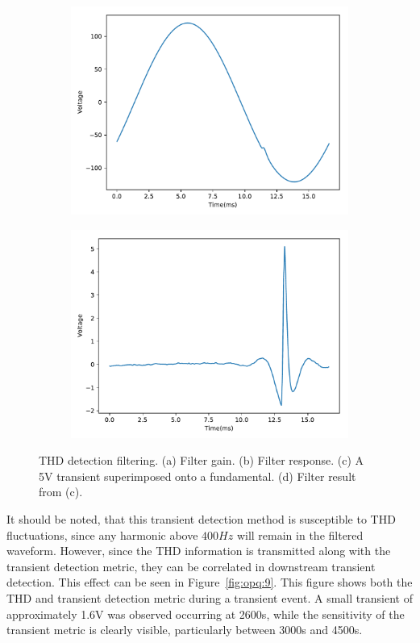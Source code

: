 \begin{figure}[h]
	\begin{subfigure}{.5\textwidth}
		\centering
		\includegraphics[width=0.86\linewidth]{img/box_eval/5v_transient.pdf}
		\caption{}
		\label{fig:opq:8:3}
	\end{subfigure}%
	\begin{subfigure}{.5\textwidth}
		\centering
		\includegraphics[width=0.86\linewidth]{img/box_eval/5v_transient_filtered.pdf}
		\caption{}
		\label{fig:opq:8:4}
	\end{subfigure}
	\caption{THD detection filtering. (a) Filter gain. (b) Filter response. (c) A 5V transient superimposed onto a fundamental. (d) Filter result from (c).}
	\label{fig:opq:8}
\end{figure}

It should be noted, that this transient detection method is susceptible to THD fluctuations, since any harmonic above $400Hz$ will remain in the filtered waveform.
However, since the THD information is transmitted along with the transient detection metric, they can be correlated in downstream transient detection.
This effect can be seen in Figure~\ref{fig:opq:9}.
This figure shows both the THD and transient detection metric during a transient event.
A small transient of approximately 1.6V was observed occurring at 2600s, while the sensitivity of the transient metric is clearly visible, particularly between 3000s and 4500s.

